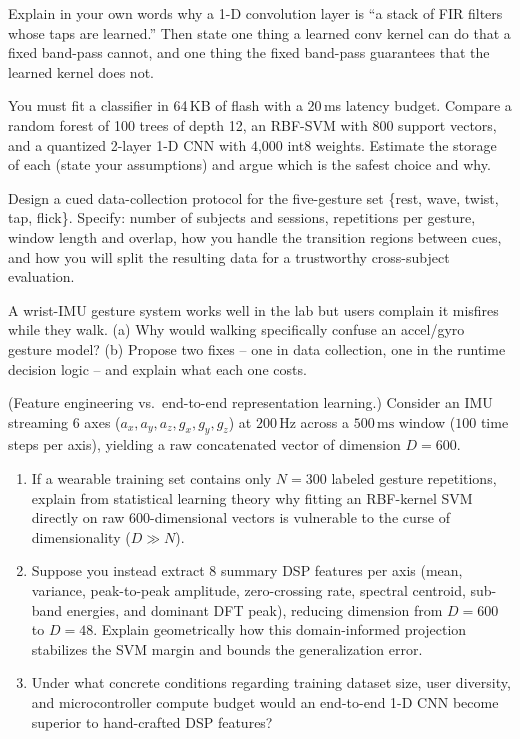 \begin{exercise}
Explain in your own words why a 1-D convolution layer is ``a stack of FIR filters whose
taps are learned.'' Then state one thing a learned conv kernel can do that a fixed
band-pass cannot, and one thing the fixed band-pass guarantees that the learned kernel
does not.
\end{exercise}

\begin{exercise}
You must fit a classifier in 64\,KB of flash with a 20\,ms latency budget. Compare a
random forest of 100 trees of depth 12, an RBF-SVM with 800 support vectors, and a
quantized 2-layer 1-D CNN with 4{,}000 int8 weights. Estimate the storage of each
(state your assumptions) and argue which is the safest choice and why.
\end{exercise}

\begin{exercise}
Design a cued data-collection protocol for the five-gesture set \{rest, wave, twist, tap,
flick\}. Specify: number of subjects and sessions, repetitions per gesture, window length
and overlap, how you handle the transition regions between cues, and how you will split
the resulting data for a trustworthy cross-subject evaluation.
\end{exercise}

\begin{exercise}
A wrist-IMU gesture system works well in the lab but users complain it misfires while they
walk. (a) Why would walking specifically confuse an accel/gyro gesture model? (b) Propose
two fixes -- one in data collection, one in the runtime decision logic -- and explain what
each one costs.
\end{exercise}

\begin{exercise}
(Feature engineering vs.\ end-to-end representation learning.) Consider an IMU streaming 6 axes ($a_x, a_y, a_z, g_x, g_y, g_z$) at $200\,\text{Hz}$ across a $500\,\text{ms}$ window ($100$ time steps per axis), yielding a raw concatenated vector of dimension $D = 600$.
\begin{enumerate}[label=(\alph*)]
  \item If a wearable training set contains only $N = 300$ labeled gesture repetitions, explain from statistical learning theory why fitting an RBF-kernel SVM directly on raw 600-dimensional vectors is vulnerable to the curse of dimensionality ($D \gg N$).
  \item Suppose you instead extract 8 summary DSP features per axis (mean, variance, peak-to-peak amplitude, zero-crossing rate, spectral centroid, sub-band energies, and dominant DFT peak), reducing dimension from $D = 600$ to $D = 48$. Explain geometrically how this domain-informed projection stabilizes the SVM margin and bounds the generalization error.
  \item Under what concrete conditions regarding training dataset size, user diversity, and microcontroller compute budget would an end-to-end 1-D CNN become superior to hand-crafted DSP features?
\end{enumerate}
\end{exercise}

